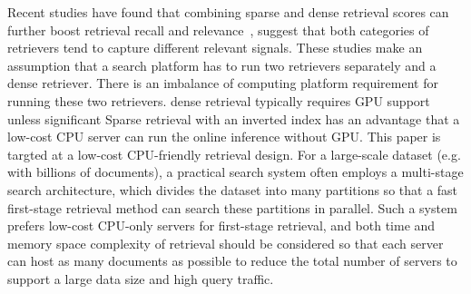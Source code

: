 Recent studies have found that combining  sparse and dense retrieval scores  can further boost
retrieval recall and relevance~\cite{Lin2021unicoil,2022LinearInterpolationJimLin,kuzi2020leveraging},
suggest  that both categories  of retrievers tend to capture  different relevant signals. 
These studies  make an assumption that  a search platform has to run two retrievers separately and a dense retriever.
There is an imbalance of computing platform requirement for running  these two retrievers.
dense retrieval typically requires GPU support unless significant  
Sparse retrieval with an inverted index has an advantage that a low-cost CPU server can run the online inference  without GPU.
This paper is targted at a low-cost CPU-friendly retrieval design.
For a large-scale  dataset (e.g. with billions of documents), a practical search system often employs  a multi-stage 
search architecture, which divides the dataset into many partitions so that  a fast first-stage  retrieval 
method  can  search these partitions in parallel.  Such a system  prefers low-cost
CPU-only servers for first-stage retrieval, and both time and memory space complexity of retrieval should be considered 
so that  each server can host as many documents as possible
to reduce the total number of servers to support a large data size and high query traffic. 




